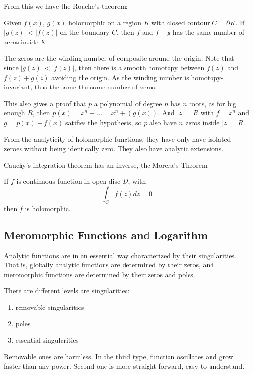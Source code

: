 \documentclass[main.tex]{subfiles}
\begin{document}
From this we have the Rouche's theorem:

\begin{theorem}
Given $f(x)$, $g(x)$ holomorphic on a region $K$ with closed contour $C = \partial K$. If $|g(z)| < |f(z)|$ on the boundary $C$, then $f$ and $f + g$ has the same number of zeros inside $K$.
\end{theorem}

\begin{theorem}
The zeros are the winding number of composite around the origin. Note that since $|g(z)| < |f(z)|$, then there is a smooth homotopy between $f(z)$ and $f(z) + g(z)$ avoiding the origin. As the winding number is homotopy-invariant, thus the same the same number of zeros.
\end{theorem}

\begin{remark}
This also gives a proof that $p$ a polynomial of degree $n$ has $n$ roots, as for big enough $R$, then $p(x) = x^n + ... = x^n + (g(x))$. And $|z| = R$ with $f = x^n$ and $g = p(x) - f(x)$ satifies the hypothesis, so $p$ also have $n$ zeros inside $|z| = R$.
\end{remark}

From the analyticity of holomorphic functions, they have only have isolated zeroes without being identically zero. They also have analytic extensions.

Cauchy's integration theorem has an inverse, the Morera's Theorem
\begin{theorem}
If $f$ is continuous function in open disc $D$, with 
$$
\int_C f(z) dz = 0
$$
then $f$ is holomorphic.
\end{theorem}


\subsection{Meromorphic Functions and Logarithm}

Analytic functions are in an essential way characterized by their singularities. That is, globally analytic functions are determined by their zeros, and meromorphic functions are determined by their zeros and poles. 

There are different levels are singularities:
\begin{enumerate}
    \item removable singularities
    \item poles
    \item essential singularities
\end{enumerate}
Removable ones are harmless. In the third type, function oscillates and grow faster than any power. Second one is more straight forward, easy to understand.
\end{document}
